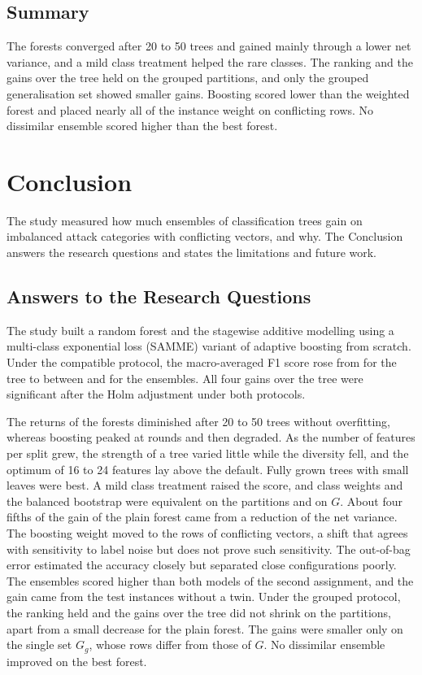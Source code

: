 \documentclass[10pt,conference]{IEEEtran}
\begin{document}
\subsection{Summary}
\label{sec:res-summary}

The forests converged after 20 to 50 trees and gained mainly through a lower net variance, and a mild class treatment helped the rare classes. The ranking and the gains over the tree held on the grouped partitions, and only the grouped generalisation set showed smaller gains. Boosting scored lower than the weighted forest and placed nearly all of the instance weight on conflicting rows. No dissimilar ensemble scored higher than the best forest.

\section{Conclusion}
\label{sec:conclusion}

The study measured how much ensembles of classification trees gain on imbalanced attack categories with conflicting vectors, and why. The Conclusion answers the research questions and states the limitations and future work.

\subsection{Answers to the Research Questions}
\label{sec:concl-findings}

The study built a random forest and the stagewise additive modelling using a multi-class exponential loss (SAMME) variant of adaptive boosting from scratch. Under the compatible protocol, the macro-averaged F1 score rose from \OPCompTreeMacroF{} for the tree to between \OPCompBoostMacroF{} and \OPCompRfWMacroF{} for the ensembles. All four gains over the tree were significant after the Holm adjustment under both protocols.

The returns of the forests diminished after 20 to 50 trees without overfitting, whereas boosting peaked at \OBoostPeakAt{} rounds and then degraded. As the number of features per split grew, the strength of a tree varied little while the diversity fell, and the optimum of 16 to 24 features lay above the default. Fully grown trees with small leaves were best. A mild class treatment raised the score, and class weights and the balanced bootstrap were equivalent on the partitions and on $G$. About four fifths of the gain of the plain forest came from a reduction of the net variance. The boosting weight moved to the rows of conflicting vectors, a shift that agrees with sensitivity to label noise but does not prove such sensitivity. The out-of-bag error estimated the accuracy closely but separated close configurations poorly. The ensembles scored higher than both models of the second assignment, and the gain came from the test instances without a twin. Under the grouped protocol, the ranking held and the gains over the tree did not shrink on the partitions, apart from a small decrease for the plain forest. The gains were smaller only on the single set $G_{g}$, whose rows differ from those of $G$. No dissimilar ensemble improved on the best forest.
\end{document}
